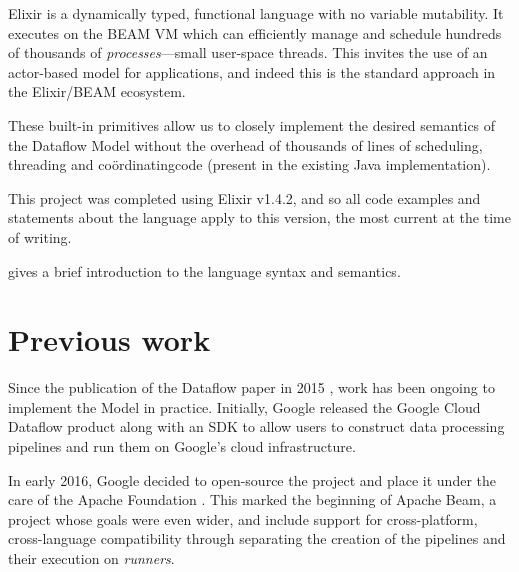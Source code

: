 Elixir is a dynamically typed, functional language with no variable mutability. 
It executes on the BEAM VM which can efficiently manage and schedule hundreds of thousands of \emph{processes}---small user-space threads.
This invites the use of an actor-based model for applications, and indeed this is the standard approach in the Elixir/BEAM ecosystem.

These built-in primitives allow us to closely implement the desired semantics of the Dataflow Model without the overhead of thousands of lines of scheduling, threading and co\"ordinating\footnotemark[1] code (present in the existing Java implementation).


This project was completed using Elixir v1.4.2, and so all code examples and statements about the language apply to this version, the most current at the time of writing.

 gives a brief introduction to the language syntax and semantics.



\section{Previous work}\label{sec:intro:previous}
Since the publication of the Dataflow paper in 2015 \cite{Akidau:2015}, work has been ongoing to implement the Model in practice.
Initially, Google released the Google Cloud Dataflow product \cite{CloudDataflow} along with an SDK to allow users to construct data processing pipelines and run them on Google's cloud infrastructure.

In early 2016, Google decided to open-source the project and place it under the care of the Apache Foundation \cite{ApacheDataflowPost}.
This marked the beginning of Apache Beam, a project whose goals were even wider, and include support for cross-platform, cross-language compatibility through separating the creation of the pipelines and their execution on \emph{runners}.

